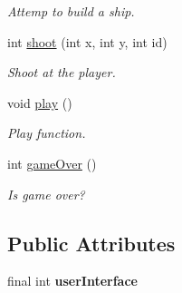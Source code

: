 \begin{DoxyCompactItemize}
\begin{DoxyCompactList}\small\item\em Attemp to build a ship. \end{DoxyCompactList}\item 
int \hyperlink{classGame_acdb27fef4ad28c9a9c07e7f095611f36}{shoot} (int x, int y, int id)
\begin{DoxyCompactList}\small\item\em Shoot at the player. \end{DoxyCompactList}\item 
void \hyperlink{classGame_afeae4232ad3b23d07dcccc383e14ff08}{play} ()
\begin{DoxyCompactList}\small\item\em Play function. \end{DoxyCompactList}\item 
int \hyperlink{classGame_a81bd2e305d61946b102ed5094d2fa6c0}{game\+Over} ()
\begin{DoxyCompactList}\small\item\em Is game over? \end{DoxyCompactList}\end{DoxyCompactItemize}
\subsection*{Public Attributes}
\begin{DoxyCompactItemize}
\item 
final int {\bfseries user\+Interface}\hypertarget{classGame_a8ccbeac22c3c1dd4c9e25d958849a00b}{}\label{classGame_a8ccbeac22c3c1dd4c9e25d958849a00b}

\end{DoxyCompactItemize}
